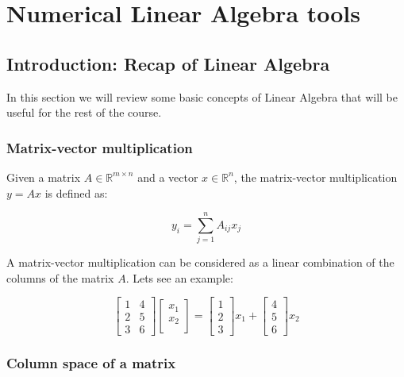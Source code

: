 \chapter{Numerical Linear Algebra tools}

\section{Introduction: Recap of Linear Algebra}

In this section we will review some basic concepts of Linear Algebra that will be useful for the rest of the course.

\subsection{Matrix-vector multiplication}

Given a matrix $A \in \mathbb{R}^{m \times n}$ and a vector $x \in \mathbb{R}^n$, the matrix-vector multiplication $y = Ax$ 
is defined as:

\begin{equation}
    y_i = \sum_{j=1}^{n} A_{ij} x_j
\end{equation}

A matrix-vector multiplication can be considered as a linear combination of the columns of the matrix $A$. Lets
see an example:

\begin{equation}
    \begin{bmatrix}
        1 & 4 \\
        2 & 5 \\
        3 & 6
    \end{bmatrix} \begin{bmatrix}
        x_1 \\
        x_2 \\
    \end{bmatrix} = \begin{bmatrix}
        1 \\
        2 \\
        3
    \end{bmatrix} x_1 + \begin{bmatrix}
        4 \\
        5 \\
        6
    \end{bmatrix} x_2
\end{equation}

\subsection{Column space of a matrix}

